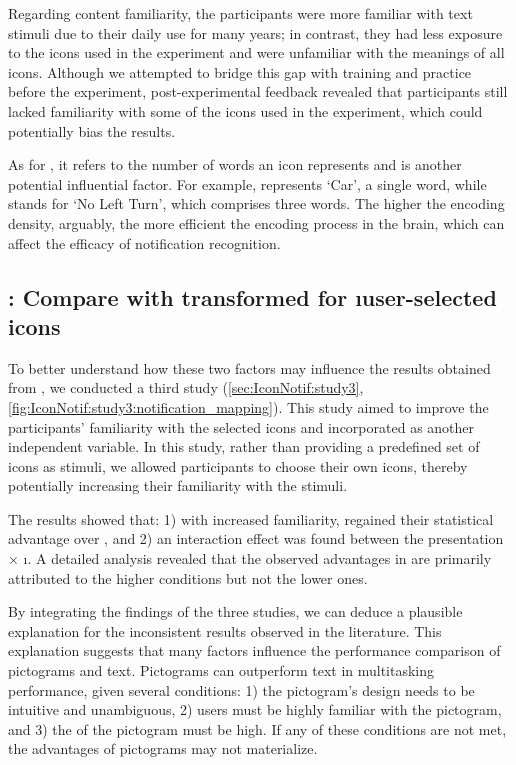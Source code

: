 Regarding content familiarity, the participants were more familiar with text stimuli due to their daily use for many years; in contrast, they had less exposure to the icons used in the experiment and were unfamiliar with the meanings of all icons. Although we attempted to bridge this gap with training and practice before the experiment, post-experimental feedback revealed that participants still lacked familiarity with some of the icons used in the experiment, which could potentially bias the results.

As for \encodingcomplexity{}, it refers to the number of words an icon represents and is another potential influential factor. For example,  represents `Car', a single word, while  stands for `No Left Turn', which comprises three words. The higher the encoding density, arguably, the more efficient the encoding process in the brain, which can affect the efficacy of notification recognition.

\subsection{\Studythree{}: Compare  with transformed  for \i{user-selected} icons}

To better understand how these two factors may influence the results obtained from \studytwo{}, we conducted a third study (\autoref{sec:IconNotif:study3}, \autoref{fig:IconNotif:study3:notification_mapping}). This study aimed to improve the participants' familiarity with the selected icons and incorporated \encodingcomplexity{} as another independent variable. In this study, rather than providing a predefined set of icons as stimuli, we allowed participants to choose their own icons, thereby potentially increasing their familiarity with the stimuli.

The \studythree{} results showed that: 1) with increased familiarity,  regained their statistical advantage over , and 2) an interaction effect was found between the presentation \format{} $\times{}$ \i{\encodingcomplexity{}}. A detailed analysis revealed that the observed advantages in  are primarily attributed to the higher \complexity{} conditions but not the lower ones.

By integrating the findings of the three studies, we can deduce a plausible explanation for the inconsistent results observed in the literature. This explanation suggests that many factors influence the performance comparison of pictograms and text. Pictograms can outperform text in multitasking performance, given several conditions: 1) the pictogram's design needs to be intuitive and unambiguous, 2) users must be highly familiar with the pictogram, and 3) the \complexity{} of the pictogram must be high. If any of these conditions are not met, the advantages of pictograms may not materialize.


